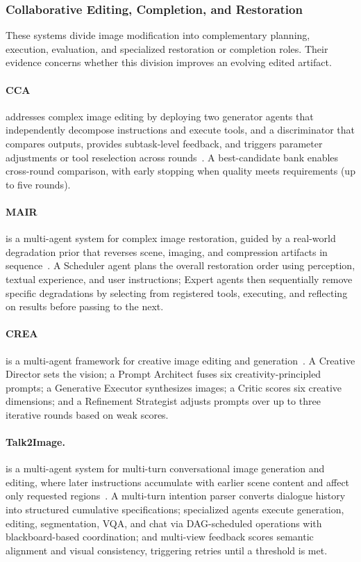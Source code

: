 \subsubsection{Collaborative Editing, Completion, and Restoration}
These systems divide image modification into complementary planning, execution, evaluation, and specialized restoration or completion roles. Their evidence concerns whether this division improves an evolving edited artifact.

\paragraph{CCA}
 addresses complex image editing by deploying two generator agents that independently decompose instructions and execute tools, and a discriminator that compares outputs, provides subtask-level feedback, and triggers parameter adjustments or tool reselection across rounds~\cite{hang2024cca}. A best-candidate bank enables cross-round comparison, with early stopping when quality meets requirements (up to five rounds). 

\paragraph{MAIR}
 is a multi-agent system for complex image restoration, guided by a real-world degradation prior that reverses scene, imaging, and compression artifacts in sequence~\cite{avg250309403}. A Scheduler agent plans the overall restoration order using perception, textual experience, and user instructions; Expert agents then sequentially remove specific degradations by selecting from registered tools, executing, and reflecting on results before passing to the next. 

\paragraph{CREA}
 is a multi-agent framework for creative image editing and generation~\cite{venkatesh2025crea}. A Creative Director sets the vision; a Prompt Architect fuses six creativity-principled prompts; a Generative Executor synthesizes images; a Critic scores six creative dimensions; and a Refinement Strategist adjusts prompts over up to three iterative rounds based on weak scores.

\paragraph{Talk2Image.}
 is a multi-agent system for multi-turn conversational image generation and editing, where later instructions accumulate with earlier scene content and affect only requested regions~\cite{avg250806916}. A multi-turn intention parser converts dialogue history into structured cumulative specifications; specialized agents execute generation, editing, segmentation, VQA, and chat via DAG-scheduled operations with blackboard-based coordination; and multi-view feedback scores semantic alignment and visual consistency, triggering retries until a threshold is met. 

